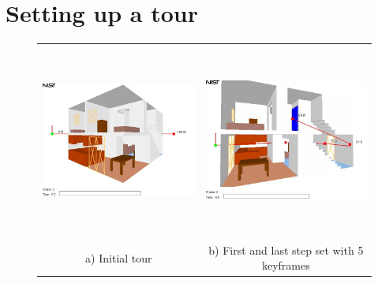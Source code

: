 \documentclass[11pt,twoside]{book}
\newcommand{\figheightA}{2.5in}
\begin{document}
\section{Setting up a tour}
\begin{figure}[\figoptions]
\begin{center}
\begin{tabular}{cc}
\includegraphics[height=\figheightA]{FIGURES/figTOUR_1}&
\includegraphics[height=\figheightA]{FIGURES/figTOUR_2}\\
a) Initial tour&b) First and last step set with 5 keyframes\\

\end{tabular}
\end{center}
\end{figure}
\end{document}
